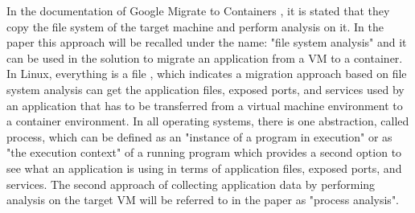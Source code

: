 \documentclass[twocolumn]{article}
\begin{document}
In the documentation of Google Migrate to Containers \cite{Google-2024}, it is stated that they copy the file system of the target machine and perform analysis on it. In the paper this approach will be recalled under the name: "file system analysis" and it can be used in the solution to migrate an application from a VM to a container. In Linux, everything is a file \cite{Torvalds-2002}, which indicates a migration approach based on file system analysis can get the application files, exposed ports, and services used by an application that has to be transferred from a virtual machine environment to a container environment. In all operating systems, there is one abstraction, called process, which can be defined as an "instance of a program in execution" or as "the execution context" of a running program \cite{BovetEtAl-2005} which provides a second option to see what an application is using in terms of application files, exposed ports, and services. The second approach of collecting application data by performing analysis on the target VM will be referred to in the paper as "process analysis".
\end{document}
